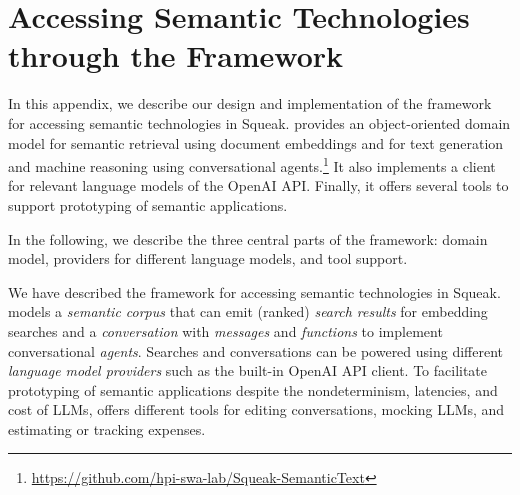 
\chapter{Accessing Semantic Technologies through the \semtex Framework}
\label{apx:semtex}

In this appendix, we describe our design and implementation of the \semtex framework for accessing semantic technologies in Squeak.
\semtex provides an object-oriented domain model for semantic retrieval using document embeddings and for text generation and machine reasoning using conversational agents.\footnote{\url{https://github.com/hpi-swa-lab/Squeak-SemanticText}}
It also implements a client for relevant language models of the OpenAI API.
Finally, it offers several tools to support prototyping of semantic applications.

In the following, we describe the three central parts of the framework: domain model, providers for different language models, and tool support.


\begin{summary}
	We have described the \semtex framework for accessing semantic technologies in Squeak.
	\semtex models a \emph{semantic corpus} that can emit (ranked) \emph{search results} for embedding searches and a \emph{conversation} with \emph{messages} and \emph{functions} to implement conversational \emph{agents}.
	Searches and conversations can be powered using different \emph{language model providers} such as the built-in OpenAI API client.
	To facilitate prototyping of semantic applications despite the nondeterminism, latencies, and cost of LLMs, \semtex offers different tools for editing conversations, mocking LLMs, and estimating or tracking expenses.
\end{summary}
